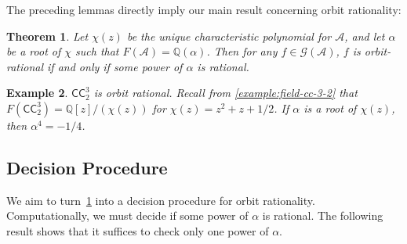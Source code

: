 \documentclass[12pt, letterpaper]{article}
\newcommand{\Q}{\mathbb Q}
\newcommand{\A}{\mathcal A}
\newcommand{\CC}{\mathsf{CC}}
\newcommand{\gp}{\mathcal G}
\newtheorem{thm}{Theorem}[section]
\newtheorem{example}[thm]{Example}
\begin{document}
The preceding lemmas directly imply our main result concerning orbit
rationality:
\begin{thm}\label{thm:orbit_rational_power}
     Let $\chi(z)$ be the unique characteristic polynomial for $\A$, and let
     $\alpha$ be a root of $\chi$ such that $F(\A) = \Q(\alpha)$.  Then for any
     $f \in \gp(\A)$, $f$ is orbit-rational if and only if some power of
     $\alpha$ is rational.
\end{thm}

\begin{example}
    $\CC^3_2$ is orbit rational. Recall from \cref{example:field-cc-3-2} that
    $F(\CC^3_2) = \Q[z] / (\chi(z))$ for $\chi(z) = z^2 + z + 1/2$.  If
    $\alpha$ is a root of $\chi(z)$, then $\alpha^4 = -1/4$.
\end{example}

\subsection{Decision Procedure}
We aim to turn~\cref{thm:orbit_rational_power} into a decision procedure for
orbit rationality. Computationally, we must decide if some power of $\alpha$ is
rational. The following result shows that it suffices to check only one power
of $\alpha$.
\end{document}
